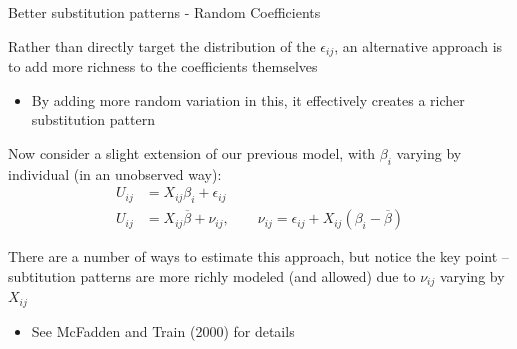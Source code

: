 \documentclass[notes,11pt, aspectratio=169]{beamer}
\newenvironment{wideitemize}{\itemize\addtolength{\itemsep}{10pt}}{\enditemize}
\begin{document}
\begin{frame}{Better substitution patterns - Random Coefficients}
  \begin{wideitemize}
  \item Rather than directly target the distribution of the
    $\epsilon_{ij}$, an alternative approach is to add more richness
    to the coefficients themselves
    \begin{itemize}
    \item By adding more random variation in this, it effectively
      creates a richer substitution pattern
    \end{itemize}
  \item Now consider a slight extension of our previous model, with
    $\beta_{i}$ varying by individual (in an unobserved way):
    \begin{align*}
      U_{ij} &= X_{ij}\beta_{i} + \epsilon_{ij}\\
      U_{ij} &= X_{ij}\overline{\beta} + \nu_{ij}, \qquad \nu_{ij} = \epsilon_{ij} + X_{ij}(\beta_{i}-\overline{\beta})
    \end{align*}
  \item There are a number of ways to estimate this approach, but
    notice the key point -- subtitution patterns are more richly
    modeled (and allowed) due to $\nu_{ij}$ varying by $X_{ij}$
    \begin{itemize}
    \item See McFadden and Train (2000) for details
    \end{itemize}
  \end{wideitemize}
\end{frame}
\end{document}

